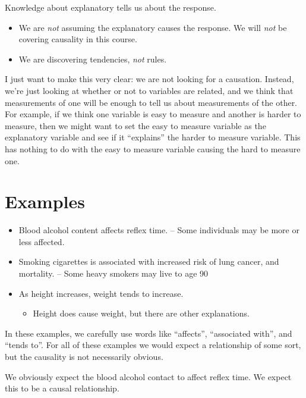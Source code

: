 \documentclass[
  letterpaper,
  DIV=11,
  numbers=noendperiod]{scrreprt}
\providecommand{\tightlist}{%
  \setlength{\itemsep}{0pt}\setlength{\parskip}{0pt}}\usepackage{longtable,booktabs,array}
\begin{document}
Knowledge about explanatory tells us about the response.

\pspace\pause

\begin{itemize}
\tightlist
\item
  We are \emph{not} assuming the explanatory causes the response. We
  will \emph{not} be covering causality in this course.\lspace
\item
  We are discovering tendencies, \emph{not} rules.
\end{itemize}

I just want to make this very clear: we are not looking for a causation.
Instead, we're just looking at whether or not to variables are related,
and we think that measurements of one will be enough to tell us about
measurements of the other. For example, if we think one variable is easy
to measure and another is harder to measure, then we might want to set
the easy to measure variable as the explanatory variable and see if it
``explains'' the harder to measure variable. This has nothing to do with
the easy to measure variable causing the hard to measure one.

\hypertarget{examples}{%
\section{Examples}\label{examples}}

\begin{itemize}
\tightlist
\item
  Blood alcohol content affects reflex time. -- Some individuals may be
  more or less affected.\lspace
\item
  Smoking cigarettes is associated with increased risk of lung cancer,
  and mortality. -- Some heavy smokers may live to age 90\lspace
\item
  As height increases, weight tends to increase.

  \begin{itemize}
  \tightlist
  \item
    Height does cause weight, but there are other explanations.
  \end{itemize}
\end{itemize}

In these examples, we carefully use words like ``affects'', ``associated
with'', and ``tends to''. For all of these examples we would expect a
relationship of some sort, but the causality is not necessarily obvious.

We obviously expect the blood alcohol contact to affect reflex time. We
expect this to be a causal relationship.
\end{document}
